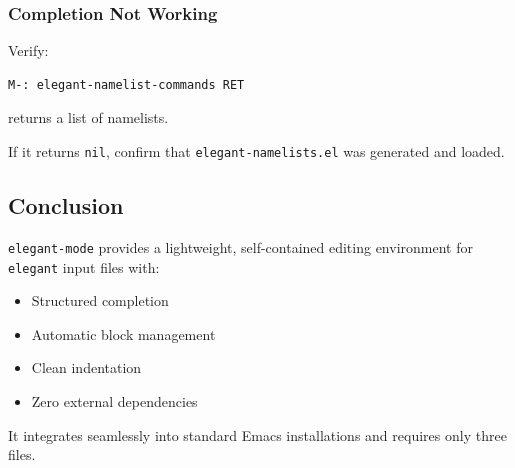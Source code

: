 \subsubsection{Completion Not Working}

Verify:
\begin{lstlisting}
M-: elegant-namelist-commands RET
\end{lstlisting}
returns a list of namelists.

If it returns \texttt{nil}, confirm that
\texttt{elegant-namelists.el} was generated and loaded.

\subsection{Conclusion}

\texttt{elegant-mode} provides a lightweight, self-contained editing
environment for {\tt elegant} input files with:

\begin{itemize}[noitemsep]
\item Structured completion
\item Automatic block management
\item Clean indentation
\item Zero external dependencies
\end{itemize}

It integrates seamlessly into standard Emacs installations and requires only three files.


